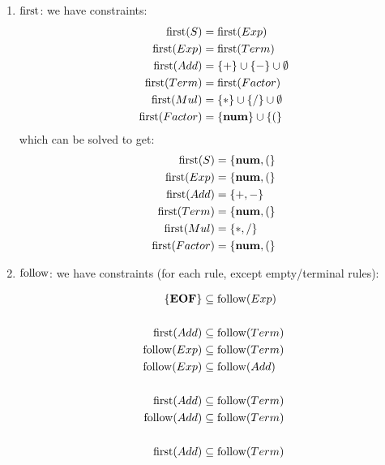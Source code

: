 \begin{exercise}{}
\begin{solution}
\begin{enumerate}
\begin{enumerate}
          \item \(\operatorname{first}\): we have constraints:
            \begin{align*}
              \operatorname{first}(S) &= \operatorname{first}(Exp) \\
              \operatorname{first}(Exp) &= \operatorname{first}(Term) \\
              \operatorname{first}(Add) &= \{+\} \cup \{-\} \cup \emptyset \\
              \operatorname{first}(Term) &= \operatorname{first}(Factor) \\
              \operatorname{first}(Mul) &= \{*\} \cup \{/\} \cup \emptyset \\
              \operatorname{first}(Factor) &= \{\mathbf{num}\} \cup \{(\}
            \end{align*}
            which can be solved to get:
            \begin{align*}
              \operatorname{first}(S) &= \{\mathbf{num}, (\} \\
              \operatorname{first}(Exp) &= \{\mathbf{num}, (\} \\
              \operatorname{first}(Add) &= \{+, -\} \\
              \operatorname{first}(Term) &= \{\mathbf{num}, (\} \\
              \operatorname{first}(Mul) &= \{*, /\} \\
              \operatorname{first}(Factor) &= \{\mathbf{num}, (\}
            \end{align*}
          \item \(\operatorname{follow}\): we have constraints (for each rule, except
          empty/terminal rules):
          \begin{multicols}{2}
            \allowdisplaybreaks
            \begin{align*}
              \{\mathbf{EOF}\} &\subseteq \follow(Exp) \\
              &\\
              \first(Add) &\subseteq \follow(Term) \\
              \follow(Exp) &\subseteq \follow(Term) \\
              \follow(Exp) &\subseteq \follow(Add) \\
              &\\
              \first(Add) &\subseteq \follow(Term) \\
              \follow(Add) &\subseteq \follow(Term) \\
              &\\
              \first(Add) &\subseteq \follow(Term) \\

\end{align*}
\end{multicols}
\end{enumerate}
\end{enumerate}
\end{solution}
\end{exercise}
